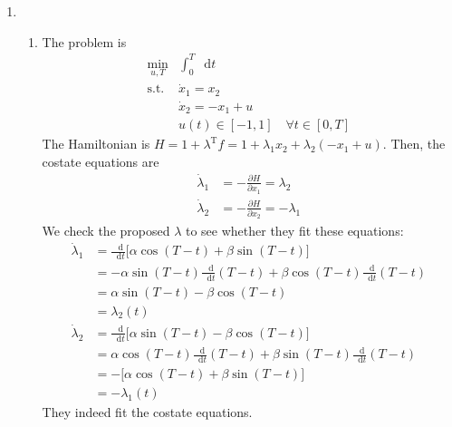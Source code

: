 \documentclass[letterpaper,11pt,titlepage]{article}
\newcommand*\dif{\mathop{}\!\mathrm{d}}
\newcommand{\trans}{^\text{T}}
\newcommand*\pder[2]{\frac{\partial #1}{\partial #2}}
\begin{document}
\begin{enumerate}[leftmargin=0pt]
    \item 
        \begin{enumerate}
            \item The problem is
                \begin{align}
                    \min_{u,T} {} & \int_0^T \!\dif t \\
                    \text{s.t. } & \dot x_1 = x_2 \\
                                 & \dot x_2 = -x_1 + u \\
                                 & u(t)\in[-1,1] \quad \forall t\in[0,T]
                \end{align}
                The Hamiltonian is $H = 1 + \lambda\trans f = 1 + \lambda_1 x_2 + \lambda_2 (-x_1 + u)$. Then, the costate equations are
                \begin{align}
                    \dot\lambda_1 &= -\pder{H}{x_1} = \lambda_2 \\
                    \dot\lambda_2 &= -\pder{H}{x_2} = -\lambda_1
                \end{align}
                We check the proposed $\lambda$ to see whether they fit these equations:
                \begin{align}
                    \dot\lambda_1 &= \frac{\dif}{\dif t} \Big[ \alpha\cos(T-t) + \beta\sin(T-t) \Big] \\
                                  &= -\alpha\sin(T-t)\frac{\dif}{\dif t}(T-t) + \beta\cos(T-t)\frac{\dif}{\dif t}(T-t) \\
                                  &= \alpha\sin(T-t) - \beta\cos(T-t) \\
                                  &= \lambda_2(t) \\
                    \dot\lambda_2 &= \frac{\dif}{\dif t} \Big[ \alpha\sin(T-t) - \beta\cos(T-t) \Big] \\
                                  &= \alpha\cos(T-t)\frac{\dif}{\dif t}(T-t) + \beta\sin(T-t)\frac{\dif}{\dif t}(T-t) \\
                                  &= - \Big[ \alpha\cos(T-t) + \beta\sin(T-t) \Big] \\
                                  &= -\lambda_1(t)
                \end{align}
                They indeed fit the costate equations.


\end{enumerate}
\end{enumerate}
\end{document}
